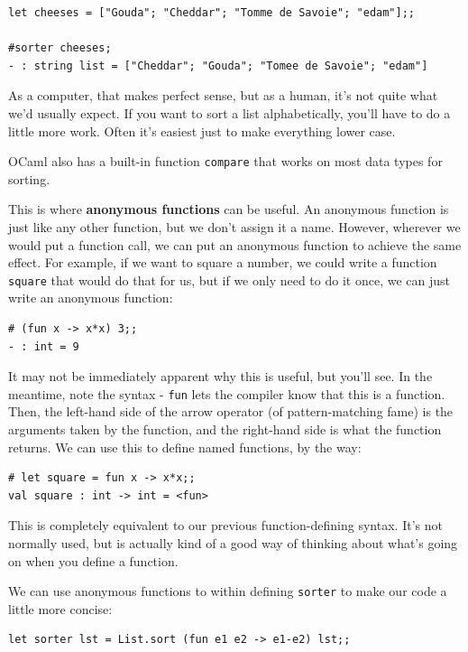 \documentclass[10pt]{book}
\begin{document}
\beforeverb
\begin{verbatim}
let cheeses = ["Gouda"; "Cheddar"; "Tomme de Savoie"; "edam"];;

#sorter cheeses;
- : string list = ["Cheddar"; "Gouda"; "Tomee de Savoie"; "edam"]
\end{verbatim}
\afterverb
As a computer, that makes perfect sense, but as a human, it's not 
quite what we'd usually expect. If you want to sort a list alphabetically,
you'll have to do a little more work. Often it's easiest just to make 
everything lower case.

OCaml also has a built-in function {\tt compare} that works on most 
data types for sorting.

This is where {\bf anonymous functions} can be useful. An anonymous function
is just like any other function, but we don't assign it a name. However, 
wherever we would put a function call, we can put an anonymous function to 
achieve the same effect. For example, if we want to square a number, we could
write a function {\tt square} that would do that for us, but if we only need 
to do it once, we can just write an anonymous function:

\beforeverb
\begin{verbatim}
# (fun x -> x*x) 3;;
- : int = 9
\end{verbatim}
\afterverb

It may not be immediately apparent why this is useful, but you'll see.
In the meantime, note the syntax - {\tt fun} lets the compiler know that
this is a function. Then, the left-hand side of the arrow operator (of 
pattern-matching fame) is the arguments taken by the function, and the
right-hand side is what the function returns. We can use this to define
named functions, by the way:

\beforeverb
\begin{verbatim}
# let square = fun x -> x*x;;
val square : int -> int = <fun>
\end{verbatim}
\afterverb
This is completely equivalent to our previous function-defining syntax. It's
not normally used, but is actually kind of a good way of thinking about what's
going on when you define a function.

We can use anonymous functions to within defining {\tt sorter} to make our
code a little more concise:

\beforeverb
\begin{verbatim}
let sorter lst = List.sort (fun e1 e2 -> e1-e2) lst;; 
\end{verbatim}
\afterverb
\end{document}

